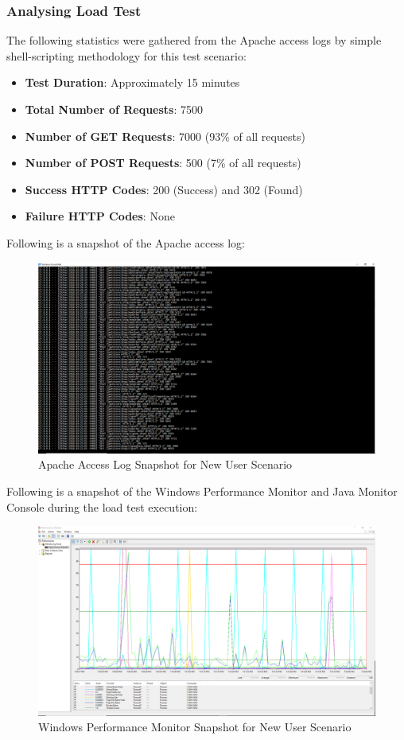 \documentclass[fontsize=12pt,paper=letter,twoside]{scrartcl}
\begin{document}
\subsubsection{Analysing Load Test}
The following statistics were gathered from the Apache access logs by simple shell-scripting methodology for this test scenario:
\begin{itemize}
\item \textbf{Test Duration}: Approximately 15 minutes
\item \textbf{Total Number of Requests}: 7500
\item \textbf{Number of GET Requests}: 7000 (93\% of all requests)
\item \textbf{Number of POST Requests}: 500 (7\% of all requests)
\item \textbf{Success HTTP Codes}: 200 (Success) and 302 (Found)
\item \textbf{Failure HTTP Codes}: None
\end{itemize}

\bigskip
\noindent Following is a snapshot of the Apache access log:
\begin{figure}[!htb]
\begin{center}
\includegraphics[width=.8\textwidth]{../../load-test/test-plans/new-user/access-log.png}
\end{center}
\caption{Apache Access Log Snapshot for New User Scenario}
\label{fig:nuser:access_log}
\end{figure}

\clearpage
\bigskip
\noindent Following is a snapshot of the Windows Performance Monitor and Java Monitor Console during the load test execution:

\begin{figure}[!htb]
\begin{center}
\includegraphics[width=.7\textwidth]{../../load-test/test-plans/new-user/perfmon-nu.png}
\end{center}
\caption{Windows Performance Monitor Snapshot for New User Scenario}
\label{fig:nuser:perfmon}
\end{figure}
\end{document}
